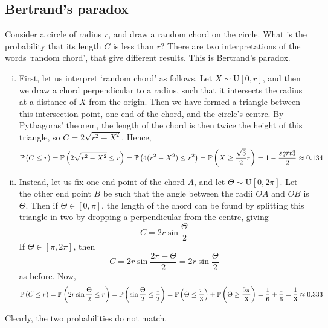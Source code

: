 \subsection{Bertrand's paradox}
Consider a circle of radius \(r\), and draw a random chord on the circle.
What is the probability that its length \(C\) is less than \(r\)?
There are two interpretations of the words `random chord', that give different results.
This is Bertrand's paradox.
\begin{enumerate}[(i)]
	\item First, let us interpret `random chord' as follows.
	      Let \(X \sim \mathrm{U}[0, r]\), and then we draw a chord perpendicular to a radius, such that it intersects the radius at a distance of \(X\) from the origin.
	      Then we have formed a triangle between this intersection point, one end of the chord, and the circle's centre.
	      By Pythagoras' theorem, the length of the chord is then twice the height of this triangle, so \(C = 2\sqrt{r^2 - X^2}\).
	      Hence,
	      \[
		      \mathbb{P}\left({C \leq r}\right) = \mathbb{P}\left({2\sqrt{r^2 - X^2} \leq r}\right) = \mathbb{P}\left({4(r^2 - X^2) \leq r^2}\right) = \mathbb{P}\left({X \geq \frac{\sqrt{3}}{2}r}\right) = 1 - \frac{sqrt 3}{2} \approx 0.134
	      \]
	\item Instead, let us fix one end point of the chord \(A\), and let \(\Theta \sim \mathrm{U}[0, 2\pi]\).
	      Let the other end point \(B\) be such that the angle between the radii \(OA\) and \(OB\) is \(\Theta\).
	      Then if \(\Theta \in [0, \pi]\), the length of the chord can be found by splitting this triangle in two by dropping a perpendicular from the centre, giving
	      \[
		      C = 2r\sin\frac{\Theta}{2}
	      \]
	      If \(\Theta \in [\pi, 2\pi]\), then
	      \[
		      C = 2r\sin\frac{2\pi - \Theta}{2} = 2r\sin\frac{\Theta}{2}
	      \]
	      as before.
	      Now,
	      \[
		      \mathbb{P}\left({C \leq r}\right) = \mathbb{P}\left({2r\sin\frac{\Theta}{2} \leq r}\right) = \mathbb{P}\left({\sin\frac{\Theta}{2} \leq \frac{1}{2}}\right) = \mathbb{P}\left({\Theta \leq \frac{\pi}{3}}\right) + \mathbb{P}\left({\Theta \geq \frac{5\pi}{3}}\right) = \frac{1}{6} + \frac{1}{6} = \frac{1}{3} \approx 0.333
	      \]
\end{enumerate}
Clearly, the two probabilities do not match.
